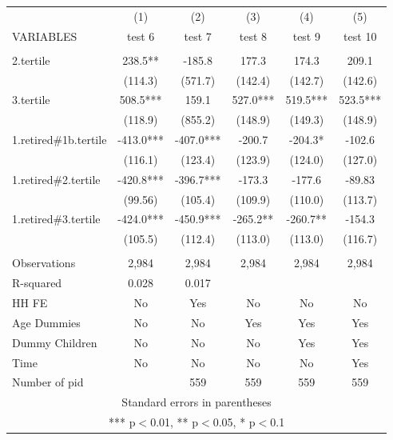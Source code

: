 \begin{tabular}{lccccc} \hline
 & (1) & (2) & (3) & (4) & (5) \\
VARIABLES & test 6 & test 7 & test 8 & test 9 & test 10 \\ \hline
 &  &  &  &  &  \\
2.tertile & 238.5** & -185.8 & 177.3 & 174.3 & 209.1 \\
 & (114.3) & (571.7) & (142.4) & (142.7) & (142.6) \\
3.tertile & 508.5*** & 159.1 & 527.0*** & 519.5*** & 523.5*** \\
 & (118.9) & (855.2) & (148.9) & (149.3) & (148.9) \\
1.retired\#1b.tertile & -413.0*** & -407.0*** & -200.7 & -204.3* & -102.6 \\
 & (116.1) & (123.4) & (123.9) & (124.0) & (127.0) \\
1.retired\#2.tertile & -420.8*** & -396.7*** & -173.3 & -177.6 & -89.83 \\
 & (99.56) & (105.4) & (109.9) & (110.0) & (113.7) \\
1.retired\#3.tertile & -424.0*** & -450.9*** & -265.2** & -260.7** & -154.3 \\
 & (105.5) & (112.4) & (113.0) & (113.0) & (116.7) \\
 &  &  &  &  &  \\
Observations & 2,984 & 2,984 & 2,984 & 2,984 & 2,984 \\
R-squared & 0.028 & 0.017 &  &  &  \\
HH FE & No & Yes & No & No & No \\
Age Dummies & No & No & Yes & Yes & Yes \\
Dummy Children & No & No & No & Yes & Yes \\
Time & No & No & No & No & Yes \\
 Number of pid &  & 559 & 559 & 559 & 559 \\ \hline
\multicolumn{6}{c}{ Standard errors in parentheses} \\
\multicolumn{6}{c}{ *** p$<$0.01, ** p$<$0.05, * p$<$0.1} \\
\end{tabular}
